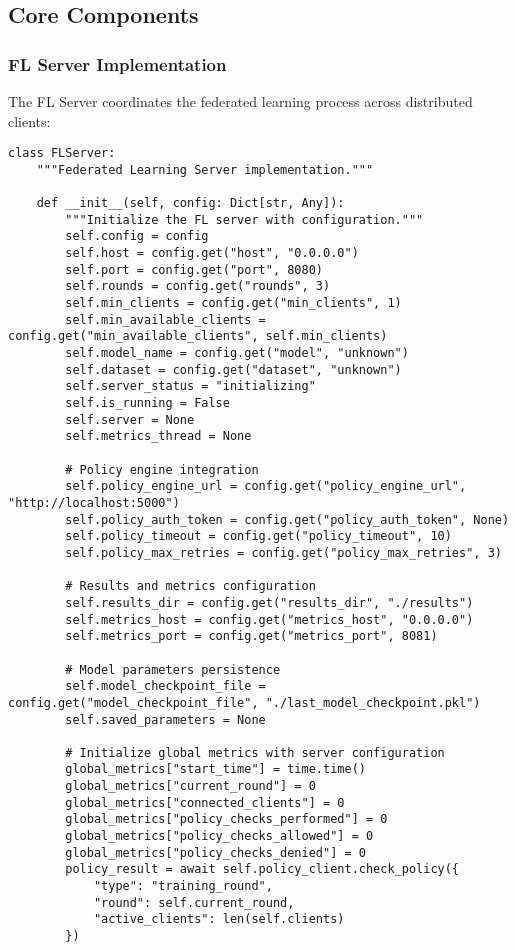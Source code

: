 \subsection{Core Components}

\subsubsection{FL Server Implementation}

The FL Server coordinates the federated learning process across distributed clients:

\begin{lstlisting}[style=pythoncode, caption=FL Server Core Implementation]
class FLServer:
    """Federated Learning Server implementation."""
    
    def __init__(self, config: Dict[str, Any]):
        """Initialize the FL server with configuration."""
        self.config = config
        self.host = config.get("host", "0.0.0.0")
        self.port = config.get("port", 8080)
        self.rounds = config.get("rounds", 3)
        self.min_clients = config.get("min_clients", 1)
        self.min_available_clients = config.get("min_available_clients", self.min_clients)
        self.model_name = config.get("model", "unknown")
        self.dataset = config.get("dataset", "unknown")
        self.server_status = "initializing"
        self.is_running = False
        self.server = None
        self.metrics_thread = None
        
        # Policy engine integration
        self.policy_engine_url = config.get("policy_engine_url", "http://localhost:5000")
        self.policy_auth_token = config.get("policy_auth_token", None)
        self.policy_timeout = config.get("policy_timeout", 10)
        self.policy_max_retries = config.get("policy_max_retries", 3)
        
        # Results and metrics configuration
        self.results_dir = config.get("results_dir", "./results")
        self.metrics_host = config.get("metrics_host", "0.0.0.0")
        self.metrics_port = config.get("metrics_port", 8081)
        
        # Model parameters persistence
        self.model_checkpoint_file = config.get("model_checkpoint_file", "./last_model_checkpoint.pkl")
        self.saved_parameters = None
        
        # Initialize global metrics with server configuration
        global_metrics["start_time"] = time.time()
        global_metrics["current_round"] = 0
        global_metrics["connected_clients"] = 0
        global_metrics["policy_checks_performed"] = 0
        global_metrics["policy_checks_allowed"] = 0
        global_metrics["policy_checks_denied"] = 0
        policy_result = await self.policy_client.check_policy({
            "type": "training_round",
            "round": self.current_round,
            "active_clients": len(self.clients)
        })
        

\end{lstlisting}
